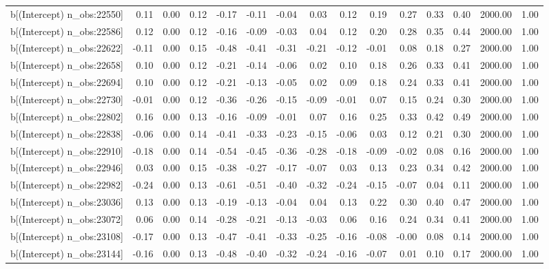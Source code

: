 \begin{table}[ht]
\begin{tabular}{rrrrrrrrrrrrrrr}
  b[(Intercept) n\_obs:22550] & 0.11 & 0.00 & 0.12 & -0.17 & -0.11 & -0.04 & 0.03 & 0.12 & 0.19 & 0.27 & 0.33 & 0.40 & 2000.00 & 1.00 \\ 
  b[(Intercept) n\_obs:22586] & 0.12 & 0.00 & 0.12 & -0.16 & -0.09 & -0.03 & 0.04 & 0.12 & 0.20 & 0.28 & 0.35 & 0.44 & 2000.00 & 1.00 \\ 
  b[(Intercept) n\_obs:22622] & -0.11 & 0.00 & 0.15 & -0.48 & -0.41 & -0.31 & -0.21 & -0.12 & -0.01 & 0.08 & 0.18 & 0.27 & 2000.00 & 1.00 \\ 
  b[(Intercept) n\_obs:22658] & 0.10 & 0.00 & 0.12 & -0.21 & -0.14 & -0.06 & 0.02 & 0.10 & 0.18 & 0.26 & 0.33 & 0.41 & 2000.00 & 1.00 \\ 
  b[(Intercept) n\_obs:22694] & 0.10 & 0.00 & 0.12 & -0.21 & -0.13 & -0.05 & 0.02 & 0.09 & 0.18 & 0.24 & 0.33 & 0.41 & 2000.00 & 1.00 \\ 
  b[(Intercept) n\_obs:22730] & -0.01 & 0.00 & 0.12 & -0.36 & -0.26 & -0.15 & -0.09 & -0.01 & 0.07 & 0.15 & 0.24 & 0.30 & 2000.00 & 1.00 \\ 
  b[(Intercept) n\_obs:22802] & 0.16 & 0.00 & 0.13 & -0.16 & -0.09 & -0.01 & 0.07 & 0.16 & 0.25 & 0.33 & 0.42 & 0.49 & 2000.00 & 1.00 \\ 
  b[(Intercept) n\_obs:22838] & -0.06 & 0.00 & 0.14 & -0.41 & -0.33 & -0.23 & -0.15 & -0.06 & 0.03 & 0.12 & 0.21 & 0.30 & 2000.00 & 1.00 \\ 
  b[(Intercept) n\_obs:22910] & -0.18 & 0.00 & 0.14 & -0.54 & -0.45 & -0.36 & -0.28 & -0.18 & -0.09 & -0.02 & 0.08 & 0.16 & 2000.00 & 1.00 \\ 
  b[(Intercept) n\_obs:22946] & 0.03 & 0.00 & 0.15 & -0.38 & -0.27 & -0.17 & -0.07 & 0.03 & 0.13 & 0.23 & 0.34 & 0.42 & 2000.00 & 1.00 \\ 
  b[(Intercept) n\_obs:22982] & -0.24 & 0.00 & 0.13 & -0.61 & -0.51 & -0.40 & -0.32 & -0.24 & -0.15 & -0.07 & 0.04 & 0.11 & 2000.00 & 1.00 \\ 
  b[(Intercept) n\_obs:23036] & 0.13 & 0.00 & 0.13 & -0.19 & -0.13 & -0.04 & 0.04 & 0.13 & 0.22 & 0.30 & 0.40 & 0.47 & 2000.00 & 1.00 \\ 
  b[(Intercept) n\_obs:23072] & 0.06 & 0.00 & 0.14 & -0.28 & -0.21 & -0.13 & -0.03 & 0.06 & 0.16 & 0.24 & 0.34 & 0.41 & 2000.00 & 1.00 \\ 
  b[(Intercept) n\_obs:23108] & -0.17 & 0.00 & 0.13 & -0.47 & -0.41 & -0.33 & -0.25 & -0.16 & -0.08 & -0.00 & 0.08 & 0.14 & 2000.00 & 1.00 \\ 
  b[(Intercept) n\_obs:23144] & -0.16 & 0.00 & 0.13 & -0.48 & -0.40 & -0.32 & -0.24 & -0.16 & -0.07 & 0.01 & 0.10 & 0.17 & 2000.00 & 1.00 \\ 

\end{tabular}
\end{table}
